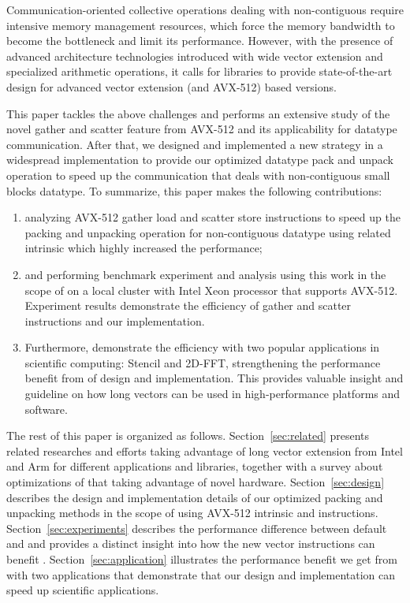 \documentclass[conference]{IEEEtran}
\begin{document}
Communication-oriented collective operations dealing with non-contiguous
require intensive memory management resources, which force
the memory bandwidth to become the bottleneck and limit its performance.
However, with the presence of advanced architecture technologies introduced
with wide vector extension and specialized arithmetic operations, it calls for
\mpi libraries to provide state-of-the-art design for advanced vector extension (\sve and AVX-512) based versions.

This paper tackles the above challenges and performs an extensive study of
the novel gather and scatter feature from AVX-512 and its applicability
for \mpi datatype communication. After that, we designed and implemented
a new strategy in a widespread \mpi implementation \ompi to provide our optimized \mpi datatype
pack and unpack operation to speed up the communication that deals with non-contiguous small blocks datatype. To summarize, this paper makes
the following contributions:
\begin{enumerate}
  \item analyzing AVX-512 gather load and scatter store instructions to speed up the packing and unpacking operation for non-contiguous datatype using related intrinsic which highly increased the performance;
  \item and performing benchmark experiment and analysis using this work
      in the scope of \ompi on a local cluster with Intel Xeon processor that supports AVX-512.
      Experiment results demonstrate the efficiency of gather and scatter instructions and our implementation.
  \item Furthermore, demonstrate the efficiency with two popular applications in
  scientific computing: Stencil and 2D-FFT, strengthening the performance
  benefit from of design and implementation. This provides valuable insight
  and guideline on how long vectors can be used in high-performance platforms and software.
\end{enumerate}

The rest of this paper is organized as follows.
Section~\ref{sec:related} presents related researches and efforts taking advantage of long vector extension from Intel and Arm for different applications and libraries, together with a survey about optimizations of \mpi that taking advantage of novel hardware.
Section~\ref{sec:design} describes the design and implementation details of our optimized packing and unpacking methods in the scope of \ompi using AVX-512 intrinsic and instructions.
Section~\ref{sec:experiments} describes the performance difference between default \ompi and \ourwork and provides a distinct insight into how the new vector instructions can benefit \mpi.
Section~\ref{sec:application} illustrates the performance benefit we get from \ourwork with two applications that demonstrate that our design and implementation can speed up scientific applications.
\end{document}
